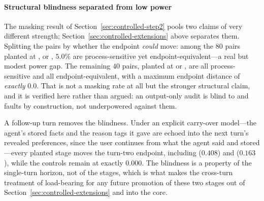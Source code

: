 \paragraph{Structural blindness separated from low power}
The masking result of Section~\ref{sec:controlled-step2} pools two claims of very different
strength; Section~\ref{sec:controlled-extensions} above separates them. Splitting the pairs by
whether the endpoint \emph{could} move: among the $80$ pairs planted at ,
 or , $5.0\%$ are process-sensitive yet endpoint-equivalent---a real
but modest power gap. The remaining $40$ pairs, planted at  or , are
all process-sensitive and all endpoint-equivalent, with a maximum endpoint distance of
\emph{exactly} $0.0$. That is not a masking rate at all but the stronger structural claim, and it
is verified here rather than argued: an output-only audit is blind to  and
 faults by construction, not underpowered against them.

A follow-up turn removes the blindness. Under an explicit carry-over model---the agent's stored
facts and the reason tags it gave are echoed into the next turn's revealed preferences, since the
user continues from what the agent said and stored---every planted stage moves the turn-two
endpoint, including  ($0.408$) and  ($0.163$), while the controls
remain at exactly $0.000$. The blindness is a property of the single-turn horizon, not of the
stages, which is what makes the cross-turn treatment of  load-bearing for any future
promotion of these two stages out of Section~\ref{sec:controlled-extensions} and into the core.

